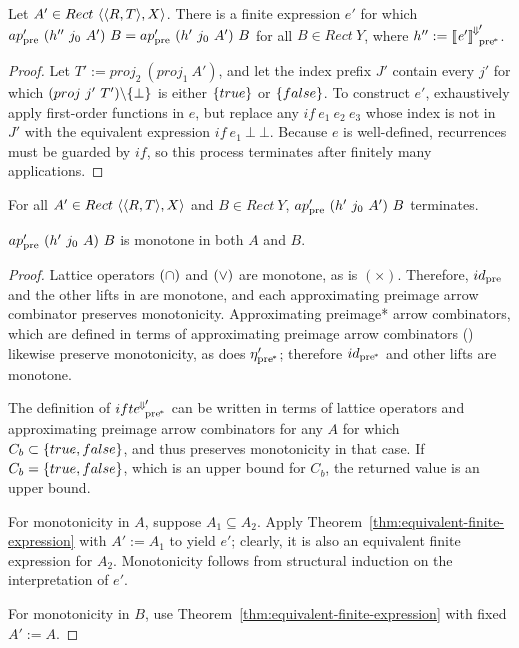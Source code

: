 \begin{theorem}
\label{thm:equivalent-finite-expression}
Let $A' \in Rect~\langle{\langle{R,T}\rangle,X}\rangle$.
There is a finite expression $\mathit{e'}$ for which $ap_\mathrm{pre}'~(h''~j_0~A')~B = ap_\mathrm{pre}'~(h'~j_0~A')~B$ for all $B \in Rect~Y$, where $h'' := {\left\llbracket{\mathit{e'}}\right\rrbracket^{\mspace{-2mu}\Downarrow\mspace{-2mu}}}_\mathrm{pre^{\mspace{-2mu}*}}'$.%
\end{theorem}
\begin{proof}
Let $T' := proj_2~(proj_1~A')$, and let the index prefix $J'$ contain every $j'$ for which $(proj~j'~T') \backslash \{{\bot}\}$ is either $\{{true}\}$ or $\{{false}\}$.
To construct $\mathit{e'}$, exhaustively apply first-order functions in $\mathit{e}$, but replace any $if~\mathit{e}_1~\mathit{e}_2~\mathit{e}_3$ whose index is not in $J'$ with the equivalent expression $if~\mathit{e}_1~\bot~\bot$.
Because $\mathit{e}$ is well-defined, recurrences must be guarded by $if$, so this process terminates after finitely many applications.
\end{proof}

\begin{corollary}[terminating]
For all $A' \in Rect~\langle{\langle{R,T}\rangle,X}\rangle$ and $B \in Rect~Y$, $ap_\mathrm{pre}'~(h'~j_0~A')~B$ terminates.
\end{corollary}

\begin{theorem}[monotone]
\label{thm:monotonicity}
$ap_\mathrm{pre}'~(h'~j_0~A)~B$ is monotone in both $A$ and $B$.%
\end{theorem}
\begin{proof}
Lattice operators $(\cap)$ and $(\vee)$ are monotone, as is $(\times)$.
Therefore, $id_\mathrm{pre}$ and the other lifts in  are monotone, and each approximating preimage arrow combinator preserves monotonicity.
Approximating preimage* arrow combinators, which are defined in terms of approximating preimage arrow combinators () likewise preserve monotonicity, as does $\eta_\mathrm{pre^{\mspace{-2mu}*}}'$; therefore $id_\mathrm{pre^{\mspace{-2mu}*}}$ and other lifts are monotone.

The definition of ${ifte^{\mspace{-2mu}\Downarrow\mspace{-2mu}}}_\mathrm{pre^{\mspace{-2mu}*}}'$ can be written in terms of lattice operators and approximating preimage arrow combinators for any $A$ for which $C_b \subset \{{true,false}\}$, and thus preserves monotonicity in that case.
If $C_b = \{{true,false}\}$, which is an upper bound for $C_b$, the returned value is an upper bound.

For monotonicity in $A$, suppose $A_1 \subseteq A_2$.
Apply Theorem~\ref{thm:equivalent-finite-expression} with $A' := A_1$ to yield $\mathit{e'}$; clearly, it is also an equivalent finite expression for $A_2$.
Monotonicity follows from structural induction on the interpretation of $\mathit{e'}$.

For monotonicity in $B$, use Theorem~\ref{thm:equivalent-finite-expression} with fixed $A' := A$.
\end{proof}

